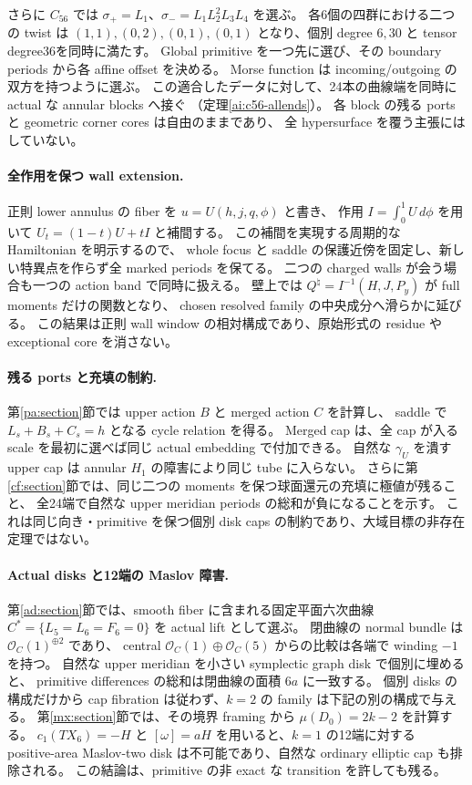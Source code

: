 \documentclass[11pt,a4paper]{article}
\theoremstyle{definition}
\begin{document}
さらに $C_{56}$ では
$\sigma_+=L_1$、$\sigma_-=L_1L_2^2L_3L_4$ を選ぶ。
各6個の四群における二つの twist は
$(1,1),(0,2),(0,1),(0,1)$ となり、個別 degree $6,30$ と tensor degree36を同時に満たす。
Global primitive を一つ先に選び、その boundary periods から各 affine offset を決める。
Morse function は incoming/outgoing の双方を持つように選ぶ。
この適合したデータに対して、24本の曲線端を同時に actual な annular blocks へ接ぐ
（定理\ref{ai:c56-allends}）。
各 block の残る ports と geometric corner cores は自由のままであり、
全 hypersurface を覆う主張にはしていない。

\paragraph{全作用を保つ wall extension.}
正則 lower annulus の fiber を $u=U(h,j,q,\phi)$ と書き、
作用 $I=\int_0^1U\,d\phi$ を用いて $U_t=(1-t)U+tI$ と補間する。
この補間を実現する周期的な Hamiltonian を明示するので、
whole focus と saddle の保護近傍を固定し、新しい特異点を作らず全 marked periods を保てる。
二つの charged walls が会う場合も一つの action band で同時に扱える。
壁上では $Q^\natural=I^{-1}(H,J,P_y)$ が full moments だけの関数となり、
chosen resolved family の中央成分へ滑らかに延びる。
この結果は正則 wall window の相対構成であり、原始形式の residue や exceptional core を消さない。

\paragraph{残る ports と充填の制約.}
第\ref{pa:section}節では upper action $B$ と merged action $C$ を計算し、
saddle で $L_s+B_s+C_s=h$ となる cycle relation を得る。
Merged cap は、全 cap が入る scale を最初に選べば同じ actual embedding で付加できる。
自然な $\gamma_U$ を潰す upper cap は annular $H_1$ の障害により同じ tube に入らない。
さらに第\ref{cf:section}節では、同じ二つの moments を保つ球面還元の充填に極値が残ること、
全24端で自然な upper meridian periods の総和が負になることを示す。
これは同じ向き・primitive を保つ個別 disk caps の制約であり、大域目標の非存在定理ではない。

\paragraph{Actual disks と12端の Maslov 障害.}
第\ref{ad:section}節では、smooth fiber に含まれる固定平面六次曲線
$C^*=\{L_5=L_6=F_6=0\}$ を actual lift として選ぶ。
閉曲線の normal bundle は $\mathcal O_C(1)^{\oplus2}$ であり、
central $\mathcal O_C(1)\oplus\mathcal O_C(5)$ からの比較は各端で winding $-1$ を持つ。
自然な upper meridian を小さい symplectic graph disk で個別に埋めると、
primitive differences の総和は閉曲線の面積 $6a$ に一致する。
個別 disks の構成だけから cap fibration は従わず、$k=2$ の family は下記の別の構成で与える。
第\ref{mx:section}節では、その境界 framing から $\mu(D_0)=2k-2$ を計算する。
$c_1(TX_6)=-H$ と $[\omega]=aH$ を用いると、$k=1$ の12端に対する
positive-area Maslov-two disk は不可能であり、自然な ordinary elliptic cap も排除される。
この結論は、primitive の非 exact な transition を許しても残る。
\end{document}
